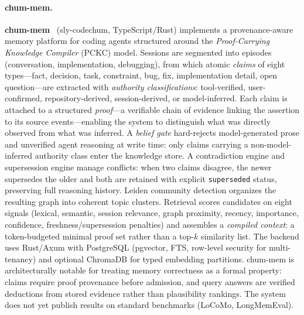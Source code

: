 \paragraph{chum-mem.}
\textbf{chum-mem}~\cite{chummem2026} (sly-codechum, TypeScript/Rust)
implements a provenance-aware memory platform for coding agents
structured around the \emph{Proof-Carrying Knowledge Compiler} (PCKC)
model.  Sessions are segmented into episodes (conversation,
implementation, debugging), from which atomic \emph{claims} of eight
types---fact, decision, task, constraint, bug, fix, implementation
detail, open question---are extracted with \emph{authority
classifications}: tool-verified, user-confirmed, repository-derived,
session-derived, or model-inferred.  Each claim is attached to a
structured \emph{proof}---a verifiable chain of evidence linking the
assertion to its source events---enabling the system to distinguish
what was directly observed from what was inferred.  A \emph{belief gate}
hard-rejects model-generated prose and unverified agent reasoning at
write time: only claims carrying a non-model-inferred authority class
enter the knowledge store.  A contradiction engine and supersession
engine manage conflicts: when two claims disagree, the newer supersedes
the older and both are retained with explicit \texttt{superseded} status,
preserving full reasoning history.  Leiden community detection organizes
the resulting graph into coherent topic clusters.  Retrieval scores
candidates on eight signals (lexical, semantic, session relevance, graph
proximity, recency, importance, confidence, freshness/supersession
penalties) and assembles a \emph{compiled context}: a token-budgeted
minimal proof set rather than a top-$k$ similarity list.  The backend
uses Rust/Axum with PostgreSQL (pgvector, FTS, row-level security for
multi-tenancy) and optional ChromaDB for typed embedding partitions.
chum-mem is architecturally notable for treating memory correctness as a
formal property: claims require proof provenance before admission, and
query answers are verified deductions from stored evidence rather than
plausibility rankings.  The system does not yet publish results on
standard benchmarks (LoCoMo, LongMemEval).

